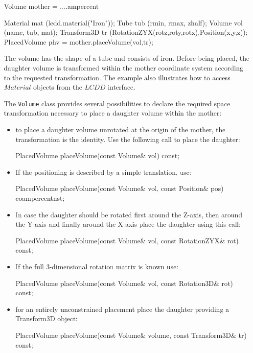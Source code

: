 \documentclass[10pt,a4paper]{article}
\begin{document}
\begin{code}
  Volume       mother = ....ampercent

  Material     mat    (lcdd.material("Iron"));
  Tube         tub    (rmin, rmax, zhalf);
  Volume       vol    (name, tub, mat);
  Transform3D  tr     (RotationZYX(rotz,roty,rotx),Position(x,y,z));
  PlacedVolume phv = mother.placeVolume(vol,tr);
\end{code}

\noindent
The volume has the shape of a tube and consists of iron.
Before being placed, the daughter volume is transformed within
the mother coordinate system according to the requested transformation.
The example also illustrates how to access $Material$ objects from the
$LCDD$ interface.

\noindent
The {\tt{Volume}} class provides several possibilities to declare
the required space transformation necessary to place a daughter volume 
within the mother:
\begin{itemize}\itemcompact
\item to place a daughter volume unrotated at the origin of the mother, the 
transformation is the identity. Use the following call to place the daughter:
\begin{unnumberedcode}
PlacedVolume placeVolume(const Volume& vol)  const;
\end{unnumberedcode}
\item If the positioning is described by a simple translation, use:
\begin{unnumberedcode}
PlacedVolume placeVolume(const Volume& vol, const Position& pos)  coampercentnst;
\end{unnumberedcode}
\item In case the daughter should be rotated first around the Z-axis, 
       then around the Y-axis and finally around the X-axis place the daughter 
       using this call:
\begin{unnumberedcode}
PlacedVolume placeVolume(const Volume& vol, const RotationZYX& rot)  const;
\end{unnumberedcode}
\item If the full 3-dimensional rotation matrix is known use:
\begin{unnumberedcode}
PlacedVolume placeVolume(const Volume& vol, const Rotation3D& rot)  const;
\end{unnumberedcode}
\item for an entirely unconstrained placement place the daughter providing
      a Transform3D object:
\begin{unnumberedcode}
PlacedVolume placeVolume(const Volume& volume, const Transform3D& tr)  const;
\end{unnumberedcode}
\end{itemize}
\end{document}
